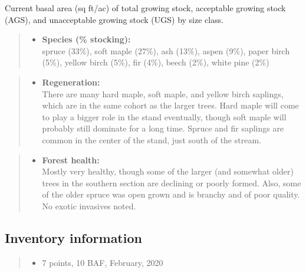 \documentclass[]{tufte-handout}
\providecommand{\tightlist}{%
  \setlength{\itemsep}{0pt}\setlength{\parskip}{0pt}}
\begin{document}
\vspace{2pt}
\footnotesize\parbox{200pt}{Current basal area (sq ft/ac) of total growing stock, acceptable growing stock (AGS), and unacceptable growing stock (UGS) by size class.}\normalsize

\begin{quote}
\begin{itemize}
\tightlist
\item
  \textbf{Species (\% stocking):}\\
  \vspace{2pt} spruce (33\%), soft maple (27\%), ash (13\%), aspen
  (9\%), paper birch (5\%), yellow birch (5\%), fir (4\%), beech (2\%),
  white pine (2\%)
\end{itemize}
\end{quote}

\begin{quote}
\begin{itemize}
\tightlist
\item
  \textbf{Regeneration:}\\
  \vspace{2pt} There are many hard maple, soft maple, and yellow birch
  saplings, which are in the same cohort as the larger trees. Hard maple
  will come to play a bigger role in the stand eventually, though soft
  maple will probably still dominate for a long time. Spruce and fir
  saplings are common in the center of the stand, just south of the
  stream.
\end{itemize}
\end{quote}

\begin{quote}
\begin{itemize}
\tightlist
\item
  \textbf{Forest health:}\\
  \vspace{2pt} Mostly very healthy, though some of the larger (and
  somewhat older) trees in the southern section are declining or poorly
  formed. Also, some of the older spruce was open grown and is branchy
  and of poor quality. No exotic invasives noted.
\end{itemize}
\end{quote}

\subsection{Inventory information}\label{inventory-information-4}

\begin{quote}
\begin{itemize}
\tightlist
\item
  7 points, 10 BAF, February, 2020
\end{itemize}
\end{quote}
\end{document}
